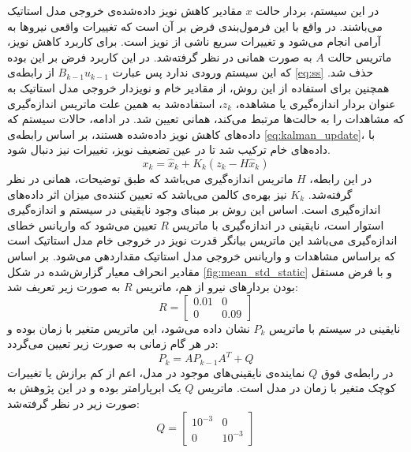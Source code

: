 در این سیستم، بردار حالت $x$ مقادیر کاهش نویز داده‌شده‌ی خروجی مدل استاتیک می‌باشند. در واقع با این فرمول‌بندی فرض بر آن است که تغییرات واقعی نیرو‌ها به آرامی انجام می‌شود و تغییرات سریع ناشی از نویز است. برای کاربرد کاهش نویز، ماتریس حالت $A$ به صورت همانی در نظر گرفته‌شد. در این کاربرد فرض بر این بوده که این سیستم ورودی ندارد پس عبارت $B_{k-1}u_{k-1}$ از رابطه‌ی \ref{eq:ss} حذف شد. همچنین برای استفاده از این روش، از مقادیر خام و نویزدار خروجی مدل استاتیک به عنوان بردار اندازه‌گیری یا مشاهده، $z_k$، استفاده‌شد به همین علت ماتریس اندازه‌گیری که مشاهدات را به حالت‌ها مرتبط می‌کند، همانی تعیین شد. در ادامه، حالات سیستم که داده‌های کاهش نویز داده‌شده هستند، بر اساس رابطه‌ی \ref{eq:kalman_update}، با داده‌های خام ترکیب شد تا در عین تضعیف نویز، تغییرات نیز دنبال شود. 
\begin{equation}\label{eq:kalman_update}
	x_k = \hat{x}_k + K_{k}(z_k - H\hat{x}_k)
\end{equation}
در این رابطه، $H$ ماتریس اندازه‌گیری می‌باشد که طبق توضیحات، همانی در نظر گرفته‌شد. $K_k$ نیز بهره‌ی کالمن می‌باشد که تعیین کننده‌ی میزان اثر داده‌های اندازه‌گیری است.
اساس این روش بر مبنای وجود نایقینی در سیستم و اندازه‌گیری استوار است، نایقینی در اندازه‌گیری با ماتریس $R$ تعیین می‌شود که واریانس خطای اندازه‌گیری می‌باشد این ماتریس بیانگر قدرت نویز در خروجی خام مدل استاتیک است که براساس مشاهدات و واریانس خروجی مدل استاتیک مقداردهی می‌شود. بر اساس مقادیر انحراف معیار گزارش‌شده در شکل \ref{fig:mean_std_static}  و با فرض مستقل بودن بردار‌های نیرو از هم، ماتریس $R$ به صورت زیر تعریف شد:
\begin{equation}
	R = 
	\begin{bmatrix}
		0.01&0\\
		0& 0.09
	\end{bmatrix}
\end{equation}
نایقینی در سیستم با ماتریس $P_k$ نشان داده می‌شود، این ماتریس متغیر با زمان بوده و در هر گام زمانی به صورت زیر تعیین می‌گردد:
\begin{equation}\label{eq:kalman_P_update}
	P_k =AP_{k-1}A^T + Q
\end{equation}
در رابطه‌ی فوق $Q$ نماینده‌ی نایقینی‌های موجود در مدل، اعم از کم برازش یا تغییرات کوچک متغیر با زمان در مدل است. ماتریس $Q$ یک ابرپارامتر بوده و در این پژوهش به صورت زیر در نظر گرفته‌شد:
\begin{equation}
	Q = 
	\begin{bmatrix}
		10^{-3}&0\\
		0& 10^{-3}
	\end{bmatrix}
\end{equation}
